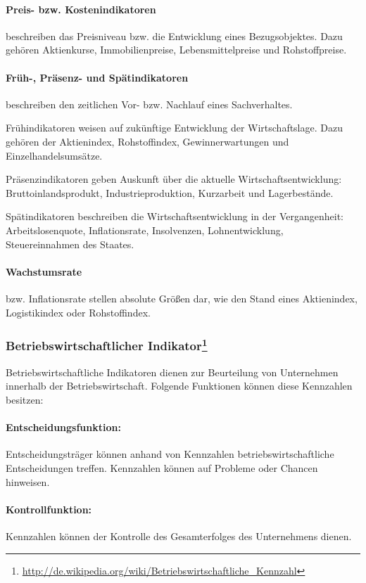\paragraph{Preis- bzw. Kostenindikatoren} beschreiben das Preisniveau bzw. die Entwicklung eines Be\-zugs\-objektes. Dazu gehören Aktienkurse, Immobilienpreise, Lebensmittelpreise und Rohstoffpreise.
\paragraph{Früh-, Präsenz- und Spätindikatoren} beschreiben den zeitlichen Vor- bzw. Nachlauf eines Sachverhaltes. 

Frühindikatoren weisen auf zukünftige Entwicklung der Wirtschaftslage. Dazu gehören der Aktienindex, Rohstoffindex, Gewinnerwartungen und Ein\-zelhandelsumsätze. 

Präsenzindikatoren geben Auskunft über die aktuelle Wirtschaftsentwicklung: Bruttoinlandsprodukt, Indu\-strie\-produktion, Kurzarbeit und Lagerbe\-stände.

Spätindikatoren beschreiben die Wirtschaftsentwicklung in der Vergangenheit: Arbeitslosenquote, Inflationsrate, Insolvenzen, Lohnentwicklung, Steu\-ereinnahmen des Staates.

\paragraph{Wachstumsrate} bzw. Inflationsrate stellen absolute Größen dar, wie den Stand eines Aktienindex, Logistikindex oder Rohstoffindex.
   

\subsubsection[Betriebswirtschaftlicher Indikator]{Betriebswirtschaftlicher Indikator\footnote{\url{http://de.wikipedia.org/wiki/Betriebswirtschaftliche_Kennzahl}}}
Betriebswirtschaftliche Indikatoren dienen zur Beurteilung von Unternehmen innerhalb der Betriebswirtschaft. Folgende Funktionen können diese Kennzahlen besitzen:

\paragraph{Entscheidungsfunktion:} Entscheidungsträger können anhand von Kennzahlen betriebswirtschaftliche Entscheidungen treffen. Kennzahlen können auf Probleme oder Chancen hinweisen.
\paragraph{Kontrollfunktion:} Kennzahlen können der Kontrolle des Gesamterfolges des Unternehmens dienen.
